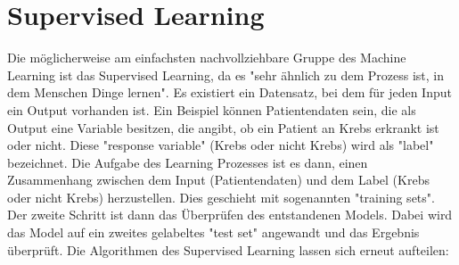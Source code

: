\section{Supervised Learning}\label{subsec:sl}
Die möglicherweise am einfachsten nachvollziehbare Gruppe des Machine Learning ist das Supervised Learning, da es "sehr ähnlich zu dem Prozess ist, in dem Menschen Dinge lernen"\citep[S.~13; eigene Übersetzung]{kim_matlab_2017}. Es existiert ein Datensatz, bei dem für jeden Input ein Output vorhanden ist. Ein Beispiel können Patientendaten sein, die als Output eine Variable besitzen, die angibt, ob ein Patient an Krebs erkrankt ist oder nicht.\citep[S.~222]{ramasubramanian_machine_2017} Diese "response variable" (Krebs oder nicht Krebs) wird als "label"\citep[S.~222]{ramasubramanian_machine_2017} bezeichnet. Die Aufgabe des Learning Prozesses ist es dann, einen Zusammenhang zwischen dem Input (Patientendaten) und dem Label (Krebs oder nicht Krebs) herzustellen. Dies geschieht mit sogenannten "training sets"\citep[S.~5]{paluszek_matlab_2017}. Der zweite Schritt ist dann das Überprüfen des entstandenen Models. Dabei wird das Model auf ein zweites gelabeltes "test set"\citep[S.~5]{paluszek_matlab_2017} angewandt und das Ergebnis überprüft.\newline
Die Algorithmen des Supervised Learning lassen sich erneut aufteilen:


